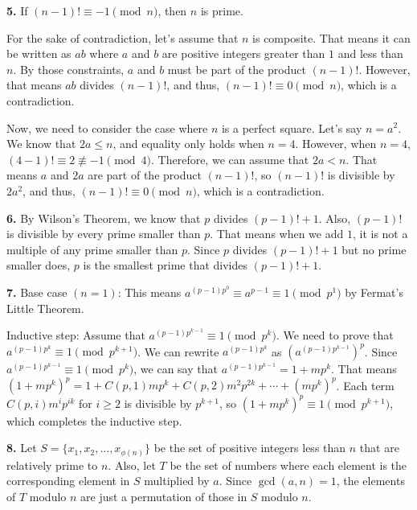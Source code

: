 \documentclass{article}
\begin{document}
\textbf{5.} If $(n - 1)! \equiv -1 \pmod{n}$, then $n$ is prime.

For the sake of contradiction, let's assume that $n$ is composite. That means it can be written as $ab$ where $a$ and $b$ are positive integers greater than $1$ and less than $n$. By those constraints, $a$ and $b$ must be part of the product $(n - 1)!$. However, that means $ab$ divides $(n - 1)!$, and thus, $(n - 1)! \equiv 0 \pmod{n}$, which is a contradiction.
\newline

Now, we need to consider the case where $n$ is a perfect square. Let's say $n = a^2$. We know that $2a \le n$, and equality only holds when $n = 4$. However, when $n = 4$, $(4 - 1)! \equiv 2 \not \equiv -1 \pmod{4}$. Therefore, we can assume that $2a < n$. That means $a$ and $2a$ are part of the product $(n - 1)!$, so $(n - 1)!$ is divisible by $2a^2$, and thus, $(n - 1)! \equiv 0 \pmod{n}$, which is a contradiction.
\newline

\textbf{6.} By Wilson's Theorem, we know that $p$ divides $(p - 1)! + 1$. Also, $(p - 1)!$ is divisible by every prime smaller than $p$. That means when we add $1$, it is not a multiple of any prime smaller than $p$. Since $p$ divides $(p - 1)! + 1$ but no prime smaller does, $p$ is the smallest prime that divides $(p - 1)! + 1$.
\newline

\textbf{7.} Base case $(n = 1)$: This means $a^{(p - 1)p^0} \equiv a^{p - 1} \equiv 1 \pmod{p^1}$ by Fermat's Little Theorem.
\newline

Inductive step: Assume that $a^{(p - 1)p^{k - 1}} \equiv 1 \pmod{p^k}$. We need to prove that $a^{(p - 1)p^k} \equiv 1 \pmod{p^{k + 1}}$. We can rewrite $a^{(p - 1)p^k}$ as $(a^{(p - 1)p^{k - 1}})^p$. Since $a^{(p - 1)p^{k - 1}} \equiv 1 \pmod{p^k}$, we can say that $a^{(p - 1)p^{k - 1}} = 1 + mp^k$. That means $(1 + mp^k)^p = 1 + C(p, 1)mp^k + C(p, 2)m^2p^{2k} + \cdots + (mp^k)^p$. Each term $C(p, i)m^ip^{ik}$ for $i \ge 2$ is divisible by $p^{k + 1}$, so $(1 + mp^k)^p \equiv 1 \pmod{p^{k + 1}}$, which completes the inductive step.
\newline

\textbf{8.} Let $S = \{x_1, x_2, \ldots, x_{\phi(n)}\}$ be the set of positive integers less than $n$ that are relatively prime to $n$. Also, let $T$ be the set of numbers where each element is the corresponding element in $S$ multiplied by $a$. Since $\gcd(a, n) = 1$, the elements of $T$ modulo $n$ are just a permutation of those in $S$ modulo $n$.
\newline
\end{document}
